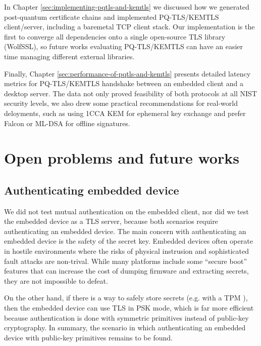 \documentclass[letterpaper,12pt,titlepage,oneside,final]{book}
\begin{document}
In Chapter \ref{sec:implementing-pqtls-and-kemtls} we discussed how we generated post-quantum certificate chains and implemented PQ-TLS/KEMTLS client/server, including a baremetal TCP client stack.
Our implementation is the first to converge all dependencies onto a single open-source TLS library (WolfSSL), so future works evaluating PQ-TLS/KEMTLS can have an easier time managing different external libraries.

Finally, Chapter \ref{sec:performance-of-pqtls-and-kemtls} presents detailed latency metrics for PQ-TLS/KEMTLS handshake between an embedded client and a desktop server.
The data not only proved feasibility of both protocols at all NIST security levels, we also drew some practical recommendations for real-world deloyments, such as using 1CCA KEM for ephemeral key exchange and prefer Falcon or ML-DSA for offline signatures.

\section{Open problems and future works}\label{sec:open-problems-future-works}
\subsection{Authenticating embedded device}\label{sec:auth-embedded-device}
We did not test mutual authentication on the embedded client, nor did we test the embedded device as a TLS server, because both scenarios require authenticating an embedded device.
The main concern with authenticating an embedded device is the safety of the secret key.
Embedded devices often operate in hostile environments where the risks of physical instrusion and sophisticated fault attacks are non-trival.
While many platforms include some ``secure boot'' features that can increase the cost of dumping firmware and extracting secrets, they are not impossible to defeat.

On the other hand, if there is a way to safely store secrets (e.g. with a TPM \cite{DBLP:conf/IEEEares/PaulSS21}), then the embedded device can use TLS in PSK mode, which is far more efficient because authentication is done with symmetric primitives instead of public-key cryptography.
In summary, the scenario in which authenticating an embedded device with public-key primitives remains to be found.
\end{document}
